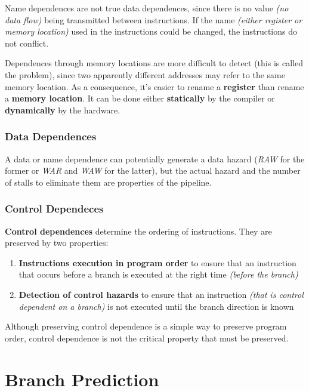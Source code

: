 \documentclass[english]{article}
\begin{document}
Name dependences are not true data dependences, since there is no value \textit{(no data flow)} being transmitted between instructions.
If the name \textit{(either register or memory location)} used in the instructions could be changed, the instructions do not conflict.

Dependences through memory locations are more difficult to detect (this is called the  problem), since two apparently different addresses may refer to the same memory location.
As a consequence, it's easier to rename a \textbf{register} than rename a \textbf{memory location}.
It can be done either \textbf{statically} by the compiler or \textbf{dynamically} by the hardware.

\subsubsection{Data Dependences}

A data or name dependence can potentially generate a data hazard (\textit{RAW} for the former or \textit{WAR} and \textit{WAW} for the latter), but the actual hazard and the number of stalls to eliminate them are properties of the pipeline.

\subsubsection{Control Dependeces}

\textbf{Control dependences} determine the ordering of instructions.
They are preserved by two properties:

\begin{enumerate}
  \item \textbf{Instructions execution in program order} to ensure that an instruction that occurs before a branch is executed at the right time \textit{(before the branch)}
  \item \textbf{Detection of control hazards} to ensure that an instruction \textit{(that is control dependent on a branch)} is not executed until the branch direction is known
\end{enumerate}

Although preserving control dependence is a simple way to preserve program order, control dependence is not the critical property that must be preserved.

\clearpage

\section{Branch Prediction}
\end{document}
